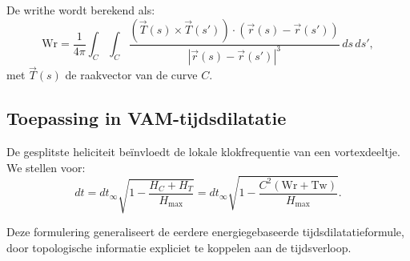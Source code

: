 De writhe wordt berekend als:
\begin{equation}
    \text{Wr} = \frac{1}{4\pi} \int_C \int_C \frac{\left(\vec{T}(s) \times \vec{T}(s')\right) \cdot \left(\vec{r}(s) - \vec{r}(s')\right)}{|\vec{r}(s) - \vec{r}(s')|^3} \, ds \, ds',
\end{equation}
met $\vec{T}(s)$ de raakvector van de curve $C$.

\subsection{Toepassing in VAM-tijdsdilatatie}

De gesplitste heliciteit beïnvloedt de lokale klokfrequentie van een vortexdeeltje. We stellen voor:
\begin{equation}
    dt = dt_\infty \sqrt{1 - \frac{H_C + H_T}{H_{\text{max}}}} = dt_\infty \sqrt{1 - \frac{C^2 (\text{Wr} + \text{Tw})}{H_{\text{max}}}}.
\end{equation}

Deze formulering generaliseert de eerdere energiegebaseerde tijdsdilatatieformule, door topologische informatie expliciet te koppelen aan de tijdsverloop.